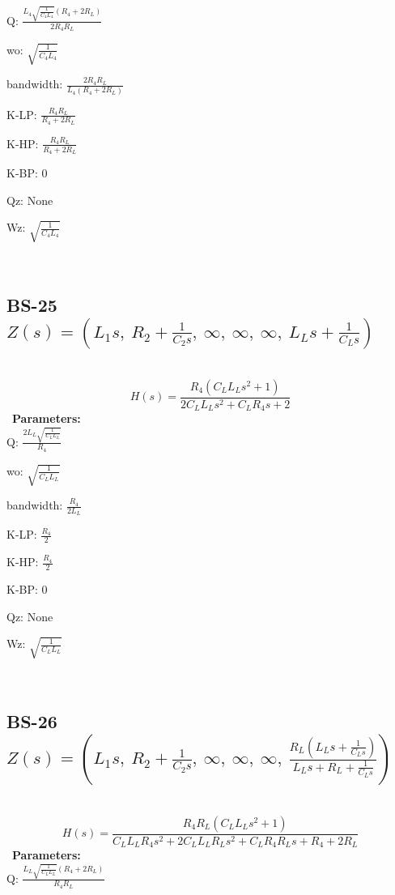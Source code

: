 \documentclass{article}
\begin{document}
Q: $\frac{L_{4} \sqrt{\frac{1}{C_{4} L_{4}}} \left(R_{4} + 2 R_{L}\right)}{2 R_{4} R_{L}}$\ 

wo: $\sqrt{\frac{1}{C_{4} L_{4}}}$\ 

bandwidth: $\frac{2 R_{4} R_{L}}{L_{4} \left(R_{4} + 2 R_{L}\right)}$\ 

K-LP: $\frac{R_{4} R_{L}}{R_{4} + 2 R_{L}}$\ 

K-HP: $\frac{R_{4} R_{L}}{R_{4} + 2 R_{L}}$\ 

K-BP: $0$\ 

Qz: $\text{None}$\ 

Wz: $\sqrt{\frac{1}{C_{4} L_{4}}}$\ 

\ 

\subsection{BS-25 $Z(s) = \left( L_{1} s, \  R_{2} + \frac{1}{C_{2} s}, \  \infty, \  \infty, \  \infty, \  L_{L} s + \frac{1}{C_{L} s}\right)$ } \ 
\textbf{\[H(s) = \frac{R_{4} \left(C_{L} L_{L} s^{2} + 1\right)}{2 C_{L} L_{L} s^{2} + C_{L} R_{4} s + 2}\] } \ 
\textbf{Parameters:}\\ 

Q: $\frac{2 L_{L} \sqrt{\frac{1}{C_{L} L_{L}}}}{R_{4}}$\ 

wo: $\sqrt{\frac{1}{C_{L} L_{L}}}$\ 

bandwidth: $\frac{R_{4}}{2 L_{L}}$\ 

K-LP: $\frac{R_{4}}{2}$\ 

K-HP: $\frac{R_{4}}{2}$\ 

K-BP: $0$\ 

Qz: $\text{None}$\ 

Wz: $\sqrt{\frac{1}{C_{L} L_{L}}}$\ 

\ 

\subsection{BS-26 $Z(s) = \left( L_{1} s, \  R_{2} + \frac{1}{C_{2} s}, \  \infty, \  \infty, \  \infty, \  \frac{R_{L} \left(L_{L} s + \frac{1}{C_{L} s}\right)}{L_{L} s + R_{L} + \frac{1}{C_{L} s}}\right)$ } \ 
\textbf{\[H(s) = \frac{R_{4} R_{L} \left(C_{L} L_{L} s^{2} + 1\right)}{C_{L} L_{L} R_{4} s^{2} + 2 C_{L} L_{L} R_{L} s^{2} + C_{L} R_{4} R_{L} s + R_{4} + 2 R_{L}}\] } \ 
\textbf{Parameters:}\\ 

Q: $\frac{L_{L} \sqrt{\frac{1}{C_{L} L_{L}}} \left(R_{4} + 2 R_{L}\right)}{R_{4} R_{L}}$\ 
\end{document}
